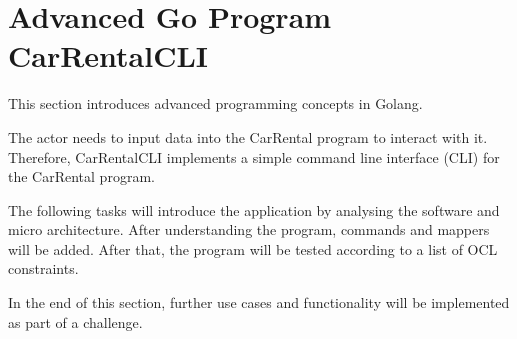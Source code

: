 




\section{Advanced Go Program CarRentalCLI}
\label{sec:advanced_go_program_car_rental_cli}
This section introduces advanced programming concepts in Golang.

The actor needs to input data into the CarRental program to interact with it.
Therefore, CarRentalCLI implements a simple command line interface (CLI) for the CarRental program.

The following tasks will introduce the application by analysing the software and micro architecture.
After understanding the program, commands and mappers will be added.
After that, the program will be tested according to a list of OCL constraints.

In the end of this section, further use cases and functionality will be implemented as part of a challenge.





